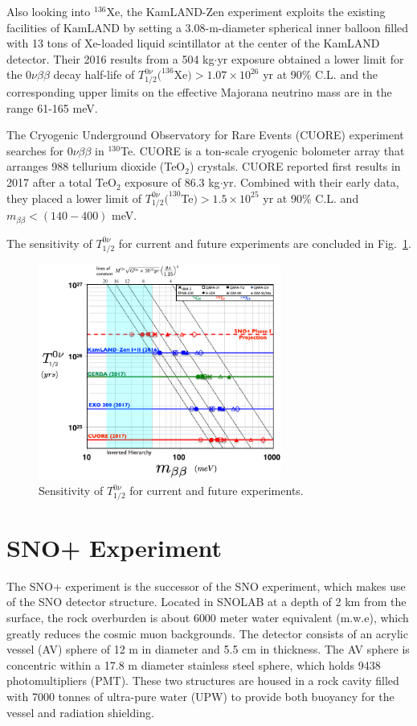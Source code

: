 \documentclass[preprint,12pt]{elsarticle}
\numberwithin{equation}{section}
\begin{document}
Also looking into $^{136}$Xe, the KamLAND-Zen experiment exploits the existing facilities of KamLAND by setting a 3.08-m-diameter spherical inner balloon filled with 13 tons of Xe-loaded liquid scintillator at the center of the KamLAND detector. Their 2016 results from a 504 kg$\cdot$yr exposure obtained a lower limit for the $0\nu\beta\beta$ decay half-life of $T^{0\nu}_{1/2}(^{136}$Xe$)>1.07\times 10^{26}$ yr at 90\% C.L. and the corresponding upper limits on the effective Majorana neutrino mass are in the range 61-165 meV\cite{kamlandZen}.

The Cryogenic Underground Observatory for Rare Events (CUORE) experiment searches for $0\nu\beta\beta$ in $^{130}$Te. CUORE is a ton-scale cryogenic bolometer array that arranges 988 tellurium dioxide (TeO$_2$) crystals. CUORE reported first results in 2017 after a total TeO$_2$ exposure of 86.3 kg$\cdot$yr. Combined with their early data, they placed a lower limit of $T^{0\nu}_{1/2}(^{130}$Te$)>1.5\times 10^{25}$ yr at 90\% C.L. and $m_{\beta\beta}<(140-400)$  meV\cite{cuore}.

The sensitivity of $T^{0\nu}_{1/2}$ for current and future experiments are concluded in Fig.~\ref{biller}\cite{stevenbiller}.
\begin{figure}[htbp]
	\centering	
	\includegraphics[width=8cm]{0nbbComparisonAug2017.png}
	\caption{Sensitivity of $T^{0\nu}_{1/2}$ for current and future experiments.}
	\label{biller}
\end{figure}

\section{SNO+ Experiment}
The SNO+ experiment is the successor of the SNO experiment, which makes use of the SNO detector structure. Located in SNOLAB at a depth of 2 km from the surface, the rock overburden is about 6000 meter water equivalent (m.w.e), which greatly reduces the cosmic muon backgrounds. The detector consists of an acrylic vessel (AV) sphere of 12 m in diameter and 5.5 cm in thickness. The AV sphere is concentric within a 17.8 m diameter stainless steel sphere, which holds 9438 photomultipliers (PMT). These two structures are housed in a rock cavity filled with 7000 tonnes of ultra-pure water (UPW) to provide both buoyancy for the vessel and radiation shielding\cite{whitepaper, erica}.
\end{document}
